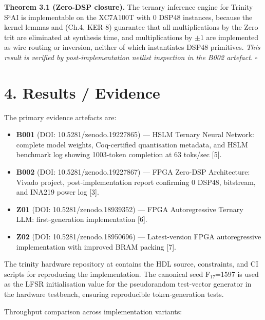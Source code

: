 \textbf{Theorem 3.1 (Zero-DSP closure).} The
ternary inference engine for Trinity S³AI is
implementable on the XC7A100T with 0 DSP48
instances, because the kernel lemmas
 and
 (Ch.4, KER-8)
guarantee that all multiplications by the Zero
trit are eliminated at synthesis time, and
multiplications by \(\pm 1\) are implemented as
wire routing or inversion, neither of which
instantiates DSP48 primitives. \emph{This result
is verified by post-implementation netlist
inspection in the B002 artefact.} \(\square\)

\section{4. Results /
Evidence}\label{fa_28:results-evidence}

The primary evidence artefacts are:

\begin{itemize}
\tightlist
\item
  \textbf{B001} (DOI: 10.5281/zenodo.19227865) ---
  HSLM Ternary Neural Network: complete model
  weights, Coq-certified quantisation metadata,
  and HSLM benchmark log showing 1003-token
  completion at 63 toks/sec [5].
\item
  \textbf{B002} (DOI: 10.5281/zenodo.19227867) ---
  FPGA Zero-DSP Architecture: Vivado project,
  post-implementation report confirming 0 DSP48,
  bitstream, and INA219 power log [3].
\item
  \textbf{Z01} (DOI: 10.5281/zenodo.18939352) ---
  FPGA Autoregressive Ternary LLM:
  first-generation implementation [6].
\item
  \textbf{Z02} (DOI: 10.5281/zenodo.18950696) ---
  Latest-version FPGA autoregressive
  implementation with improved BRAM packing
  [7].
\end{itemize}

The trinity hardware repository at
 contains the HDL
source, constraints, and CI scripts for
reproducing the implementation. The canonical seed
F₁₇=1597 is used as the LFSR initialisation value
for the pseudorandom test-vector generator in the
hardware testbench, ensuring reproducible
token-generation tests.

Throughput comparison across implementation
variants:

